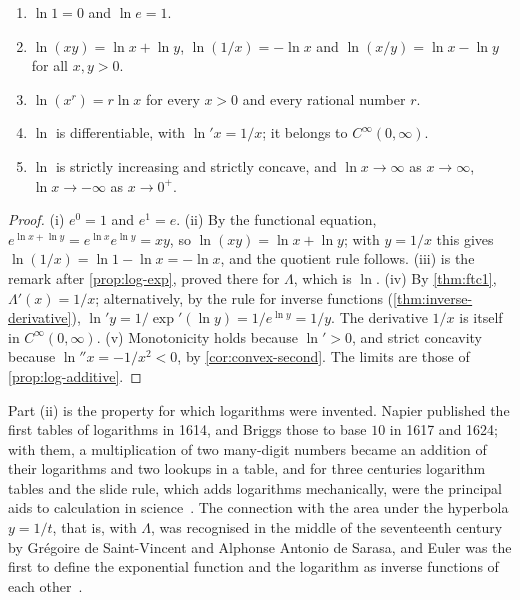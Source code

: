 \begin{theorem}
\label{thm:ln-properties}
\leavevmode
\begin{enumerate}
\item $\ln1=0$ and $\ln e=1$.
\item $\ln(xy)=\ln x+\ln y$, $\ln(1/x)=-\ln x$ and $\ln(x/y)=\ln x-\ln y$ for all $x,y>0$.
\item $\ln(x^r)=r\ln x$ for every $x>0$ and every rational number $r$.
\item $\ln$ is differentiable, with $\ln'x=1/x$; it belongs to $C^\infty(0,\infty)$.
\item $\ln$ is strictly increasing and strictly concave, and $\ln x\to\infty$ as $x\to\infty$, $\ln x\to-\infty$ as $x\to0^+$.
\end{enumerate}
\end{theorem}

\begin{proof}
(i) $e^0=1$ and $e^1=e$. (ii) By the functional equation, $e^{\ln x+\ln y}=e^{\ln x}e^{\ln y}=xy$, so $\ln(xy)=\ln x+\ln y$; with $y=1/x$ this gives $\ln(1/x)=\ln1-\ln x=-\ln x$, and the quotient rule follows. (iii) is the remark after \cref{prop:log-exp}, proved there for $\Lambda$, which is $\ln$. (iv) By \cref{thm:ftc1}, $\Lambda'(x)=1/x$; alternatively, by the rule for inverse functions (\cref{thm:inverse-derivative}), $\ln'y=1/\exp'(\ln y)=1/e^{\ln y}=1/y$. The derivative $1/x$ is itself in $C^\infty(0,\infty)$. (v) Monotonicity holds because $\ln'>0$, and strict concavity because $\ln''x=-1/x^2<0$, by \cref{cor:convex-second}. The limits are those of \cref{prop:log-additive}.
\end{proof}

Part (ii) is the property for which logarithms were invented. Napier published the first tables of logarithms in 1614, and Briggs those to base $10$ in 1617 and 1624; with them, a multiplication of two many-digit numbers became an addition of their logarithms and two lookups in a table, and for three centuries logarithm tables and the slide rule, which adds logarithms mechanically, were the principal aids to calculation in science~\cite{napier1614,maor1994}. The connection with the area under the hyperbola $y=1/t$, that is, with $\Lambda$, was recognised in the middle of the seventeenth century by Gr\'egoire de Saint-Vincent and Alphonse Antonio de Sarasa, and Euler was the first to define the exponential function and the logarithm as inverse functions of each other~\cite{maor1994,euler1748introductio}.

